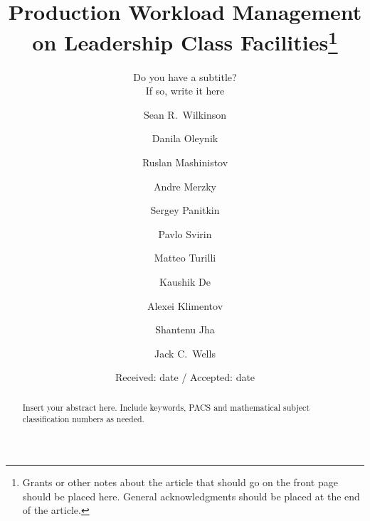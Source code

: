 \documentclass[smallextended]{svjour3}      %
\begin{document}
\title{Production Workload Management on Leadership Class Facilities\thanks{Grants or other notes about the article that should go on the front page should be
placed here. General acknowledgments should be placed at the end of the article.}
}
\subtitle{Do you have a subtitle?\\ If so, write it here}


\author{%
    Sean R.\ Wilkinson \and
    Danila Oleynik \and
    Ruslan Mashinistov \and
    Andre Merzky \and
    Sergey Panitkin \and
    Pavlo Svirin \and
    Matteo Turilli \and
    Kaushik De \and
    Alexei Klimentov \and
    Shantenu Jha \and
    Jack C.\ Wells
}



\date{Received: date / Accepted: date}

\maketitle


\begin{abstract}
Insert your abstract here. Include keywords, PACS and mathematical
subject classification numbers as needed.
\end{abstract}


\end{document}
